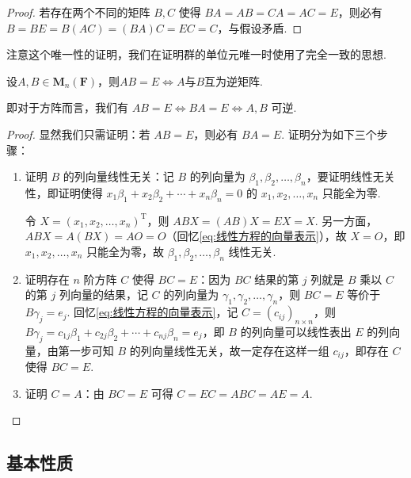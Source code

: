 \begin{proof}
    若存在两个不同的矩阵 $B,C$ 使得 $BA=AB=CA=AC=E$，则必有 $B=BE=B(AC)=(BA)C=EC=C$，与假设矛盾.
\end{proof}
注意这个唯一性的证明，我们在证明群的单位元唯一时使用了完全一致的思想.

\begin{theorem}{}{}
    设$A,B\in \mathbf{M}_n(\mathbf{F})$，则$AB=E \iff A$与$B$互为逆矩阵.
\end{theorem}
即对于方阵而言，我们有 $AB = E \iff BA = E \iff A, B$ 可逆.
\begin{proof}
    显然我们只需证明：若 $AB = E$，则必有 $BA = E$. 证明分为如下三个步骤：
    \begin{enumerate}
        \item 证明 $B$ 的列向量线性无关：记 $B$ 的列向量为 $\beta_1,\beta_2,\ldots,\beta_n$，要证明线性无关性，即证明使得 $x_1\beta_1 + x_2\beta_2 + \cdots + x_n\beta_n = 0$ 的 $x_1,x_2,\ldots,x_n$ 只能全为零.

        令 $X = (x_1,x_2,\ldots,x_n)^\mathrm{T}$，则 $ABX = (AB)X = EX = X$. 另一方面，$ABX = A(BX) = AO = O$（回忆\autoref{eq:线性方程的向量表示}），故 $X = O$，即 $x_1,x_2,\ldots,x_n$ 只能全为零，故 $\beta_1,\beta_2,\ldots,\beta_n$ 线性无关.

        \item 证明存在 $n$ 阶方阵 $C$ 使得 $BC = E$：因为 $BC$ 结果的第 $j$ 列就是 $B$ 乘以 $C$ 的第 $j$ 列向量的结果，记 $C$ 的列向量为 $\gamma_1,\gamma_2,\ldots,\gamma_n$，则 $BC = E$ 等价于 $B\gamma_j = e_j$. 回忆\autoref{eq:线性方程的向量表示}，记 $C = (c_{ij})_{n \times n}$，则 $B\gamma_j = c_{1j}\beta_1 + c_{2j}\beta_2 + \cdots + c_{nj}\beta_n = e_j$，即 $B$ 的列向量可以线性表出 $E$ 的列向量，由第一步可知 $B$ 的列向量线性无关，故一定存在这样一组 $c_{ij}$，即存在 $C$ 使得 $BC = E$.

        \item 证明 $C = A$：由 $BC = E$ 可得 $C = EC = ABC = AE = A$.
    \end{enumerate}
\end{proof}

\subsection{基本性质}


